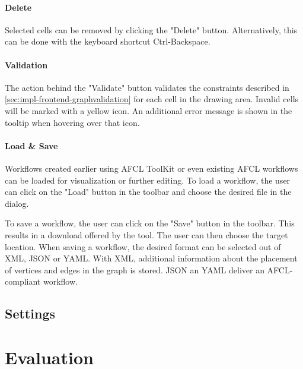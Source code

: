 \documentclass[a4paper,12pt,pdftex,halfparskip,cleardoubleempty,bibtotoc,liststotoc]{scrbook}
\begin{document}
\subsubsection{Delete}

Selected cells can be removed by clicking the "Delete" button. Alternatively, this can be done with the keyboard shortcut \textsf{Ctrl-Backspace}.

\subsubsection{Validation}

The action behind the "Validate" button validates the constraints described in \ref{sec:impl-frontend-graphvalidation} for each cell in the drawing area. Invalid cells will be marked with a yellow icon. An additional error message is shown in the tooltip when hovering over that icon.

\subsubsection{Load \& Save}

Workflows created earlier using AFCL ToolKit or even existing AFCL workflows can be loaded for visualization or further editing. To load a workflow, the user can click on the "Load" button in the toolbar and choose the desired file in the dialog.

To save a workflow, the user can click on the "Save" button in the toolbar.
This results in a download offered by the tool. The user can then choose the target location.  When saving a workflow, the desired format can be selected out of XML, JSON or YAML. With XML, additional information about the placement of vertices and edges in the graph is stored. JSON an YAML deliver an AFCL-compliant workflow.

\section{Settings}



\chapter{Evaluation}

\end{document}
